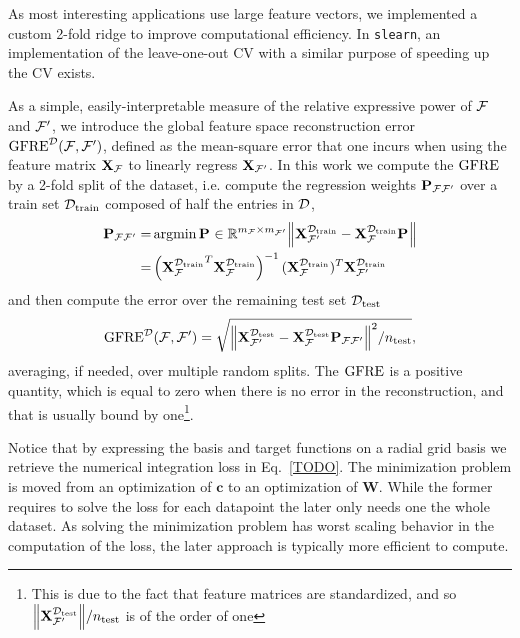 As most interesting applications use large feature vectors, we implemented a custom 2-fold ridge to improve computational efficiency.
In \texttt{slearn}, an implementation of the leave-one-out CV with a similar purpose of speeding up the CV exists.

As a simple, easily-interpretable measure of the relative expressive power of $\mathcal{F}$ and $\mathcal{F}^\prime$, we introduce the global feature space reconstruction error $\operatorname{GFRE}^{\mathcal{D}}(\mathcal{F},\mathcal{F}^\prime)$, defined as the mean-square error that one incurs when using the feature matrix $\mathbf{X}_{\mathcal{F}}$ to linearly regress $\mathbf{X}_{\mathcal{F}^\prime}$. 
In this work we compute the $\operatorname{GFRE}$ by a 2-fold split of the dataset, i.e. compute the regression weights $\mathbf{P}_{{\mathcal{F}}{\mathcal{F}^\prime}}$ over a train set $\mathcal{D}_{\mathrm{train}}$ composed of half the entries in $\mathcal{D}$,
\begin{equation}
\begin{split}
\mathbf{P}_{{\mathcal{F}}{\mathcal{F}^\prime}}= &
\operatorname{argmin} \mathbf{P}_{{}{}}\in\mathbb{R}^{m_{\mathcal{F}}\times m_{\mathcal{F}^\prime}}
\norm{\mathbf{X}^{\mathcal{D}_{\mathrm{train}}}_{\mathcal{F}^\prime} - \mathbf{X}^{\mathcal{D}_{\mathrm{train}}}_{\mathcal{F}} \mathbf{P}_{{}{}}  }\\
=&\left({\mathbf{X}_{\mathcal{F}}^{\mathcal{D}_{\mathrm{train}}}}^T \mathbf{X}_{\mathcal{F}}^{\mathcal{D}_{\mathrm{train}}}\right)^{-1}
(\mathbf{X}_{\mathcal{F}}^{\mathcal{D}_{\mathrm{train}}})^T\mathbf{X}_{\mathcal{F}^\prime}^{\mathcal{D}_{\mathrm{train}}}
\end{split}\label{eq:proj-ff1}
\end{equation}
and then compute the error over the remaining test set $\mathcal{D}_{\mathrm{test}}$
\begin{equation}
\operatorname{GFRE}^{\mathcal{D}}(\mathcal{F},\mathcal{F}^\prime) = \sqrt{{\norm{\mathbf{X}^{\mathcal{D}_{\mathrm{test}}}_{\mathcal{F}^\prime} - \mathbf{X}^{\mathcal{D}_{\mathrm{test}}}_{\mathcal{F}} \mathbf{P}_{{\mathcal{F}}{\mathcal{F}^\prime}}  }^2}/n_{\mathrm{test}}},
\label{eq:GFRE}
\end{equation}
averaging, if needed, over multiple random splits.  The $\operatorname{GFRE}$ is a positive quantity, which is equal to zero when there is no error in the reconstruction, and that is usually bound by one\footnote{This is due to the fact that feature matrices are standardized, and so $\norm{\mathbf{X}^{\mathcal{D}_{\mathrm{test}}}_{\mathcal{F}^\prime}}/n_{\mathrm{test}} $ is of the order of one}.

Notice that by expressing the basis and target functions on a radial grid basis we retrieve the numerical integration loss in Eq.~\ref{TODO}.
The minimization problem is moved from an optimization of $\mathbf{c}$ to an optimization of $\mathbf{W}$.
While the former requires to solve the loss for each datapoint the later only needs one the whole dataset.
As solving the minimization problem has worst scaling behavior in the computation of the loss, the later approach is typically more efficient to compute.

